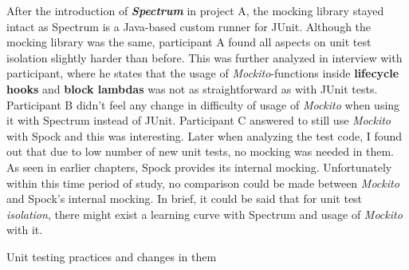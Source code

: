 After the introduction of \textbf{\textit{Spectrum}} in project A, the mocking library stayed intact as Spectrum
is a Java-based custom runner for JUnit. Although the mocking library was the same, participant A
found all aspects on unit test isolation slightly harder than before. This was further analyzed in interview with participant,
where he states that the usage of \textit{Mockito}-functions inside \textbf{lifecycle hooks} and \textbf{block lambdas} was not
as straightforward as with JUnit tests. Participant B didn't feel any change in difficulty of usage of \textit{Mockito}
when using it with Spectrum instead of JUnit. Participant C answered to still use \textit{Mockito} with Spock and this
was interesting. Later when analyzing the test code, I found out that due to low number of new unit tests, no mocking
was needed in them. As seen in earlier chapters, Spock provides its internal mocking. Unfortunately within this time
period of study, no comparison could be made between \textit{Mockito} and Spock's internal mocking. In brief, it could
be said that for unit test \textit{isolation}, there might exist a learning curve with Spectrum and usage of \textit{Mockito} with it.


    \begin{table}[H]
            \caption {Unit testing practices and changes in them} \label{tab:changes-pt10}
    \end{table}

